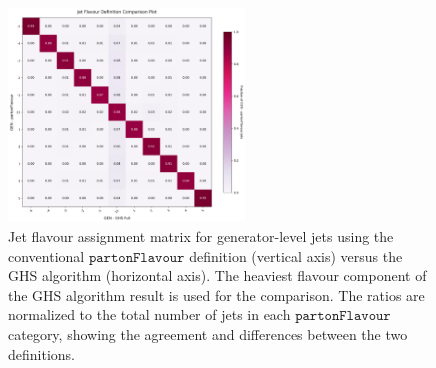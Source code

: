 \documentclass[10pt,twocolumn]{article}
\newcommand*{\parFlav}{\texttt{partonFlavour}}
\begin{document}
\begin{figure}[!bth]
    \centering
    \includegraphics[width=0.56\textwidth]{images/compare_matrix_GenJet_partonFlavour_vs_GHS_full_noLep.png}
    \caption{Jet flavour assignment matrix for generator-level jets using the conventional $\parFlav$ definition (vertical axis) versus the GHS algorithm (horizontal axis). The heaviest flavour component of the GHS algorithm result is used for the comparison. The ratios are normalized to the total number of jets in each $\parFlav$ category, showing the agreement and differences between the two definitions.}
    \label{fig:gen_jet_compare_matrix_partonFlavour_vs_GHS_full_noLep}
\end{figure}
\end{document}
